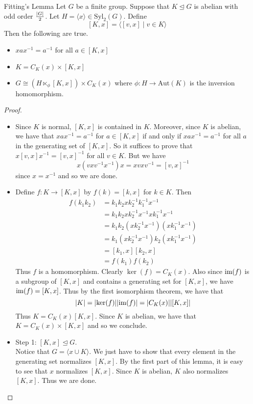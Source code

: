 \documentclass[a4paper]{article}
\begin{document}
\begin{lmm}{Fitting's Lemma}{} Let $G$ be a finite group. Suppose that $K\trianglelefteq G$ is abelian with odd order $\frac{\abs{G}}{2}$. Let $H=\langle x\rangle\in\text{Syl}_2(G)$. Define $$[K,x]=\langle[v,x]\;|\;v\in K\rangle$$ Then the following are true. 
\begin{itemize}
\item $xax^{-1}=a^{-1}$ for all $a\in[K,x]$
\item $K=C_K(x)\times[K,x]$
\item $G\cong(H\ltimes_\phi[K,x])\times C_K(x)$ where $\phi:H\to\text{Aut}(K)$ is the inversion homomorphism. 
\end{itemize} 
\begin{proof}~\\
\begin{itemize}
\item Since $K$ is normal, $[K,x]$ is contained in $K$. Moreover, since $K$ is abelian, we have that $xax^{-1}=a^{-1}$ for $a\in[K,x]$ if and only if $xax^{-1}=a^{-1}$ for all $a$ in the generating set of $[K,x]$. So it suffices to prove that $x[v,x]x^{-1}=[v,x]^{-1}$ for all $v\in K$. But we have $$x(vxv^{-1}x^{-1})x=xvxv^{-1}=[v,x]^{-1}$$ since $x=x^{-1}$ and so we are done. 
\item Define $f:K\to[K,x]$ by $f(k)=[k,x]$ for $k\in K$. Then 
\begin{align*}
f(k_1k_2)&=k_1k_2xk_2^{-1}k_1^{-1}x^{-1}\\
&=k_1k_2xk_2^{-1}x^{-1}xk_1^{-1}x^{-1}\\
&=k_1k_2(xk_2^{-1}x^{-1})(xk_1^{-1}x^{-1})\\
&=k_1(xk_2^{-1}x^{-1})k_2(xk_1^{-1}x^{-1})\tag{$K$ is abelian}\\
&=[k_1,x][k_2,x]\\
&=f(k_1)f(k_2)
\end{align*}
Thus $f$ is a homomorphism. Clearly $\ker(f)=C_K(x)$. Also since $\operatorname{im}(f)$ is a subgroup of $[K,x]$ and contains a generating set for $[K,x]$, we have $\operatorname{im}(f)=[K,x]$. Thus by the first isomorphism theorem, we have that $$\abs{K}=\abs{\ker(f)}\abs{\operatorname{im}(f)}=\abs{C_K(x)}\abs{[K,x]}$$ Thus $K=C_K(x)[K,x]$. Since $K$ is abelian, we have that $K=C_K(x)\times[K,x]$ and so we conclude. 
\item Step 1: $[K,x]\trianglelefteq G$. \\
Notice that $G=\langle x\cup K\rangle$. We just have to show that every element in the generating set normalizes $[K,x]$. By the first part of this lemma, it is easy to see that $x$ normalizes $[K,x]$. Since $K$ is abelian, $K$ also normalizes $[K,x]$. Thus we are done. 
\end{itemize}
\end{proof}
\end{lmm}
\end{document}
